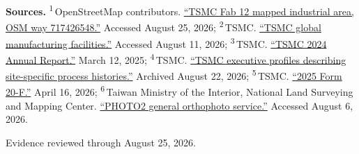 \begin{minipage}[t][0.90\textheight][t]{\textwidth}
{\sffamily\scriptsize\setlength{\emergencystretch}{1.5em}\textbf{Sources.} \textsuperscript{1}\,OpenStreetMap contributors. \href{\detokenize{https://www.openstreetmap.org/way/717426548}}{\enquote{TSMC Fab 12 mapped industrial area, OSM way 717426548.}} Accessed August 25, 2026; \textsuperscript{2}\,TSMC. \href{\detokenize{https://www.tsmc.com/english/aboutTSMC/TSMC_Fabs}}{\enquote{TSMC global manufacturing facilities.}} Accessed August 11, 2026; \textsuperscript{3}\,TSMC. \href{\detokenize{https://investor.tsmc.com/sites/ir/annual-report/2024/2024}\%\detokenize{20Annual}\%\detokenize{20Report-E.pdf}}{\enquote{TSMC 2024 Annual Report.}} March 12, 2025; \textsuperscript{4}\,TSMC. \href{\detokenize{https://web.archive.org/web/20260822170034/https://www.tsmc.com/english/aboutTSMC/executives.htm}}{\enquote{TSMC executive profiles describing site-specific process histories.}} Archived August 22, 2026; \textsuperscript{5}\,TSMC. \href{\detokenize{https://investor.tsmc.com/sites/ir/sec-filings/2025_20F}\%\detokenize{20Report.pdf}}{\enquote{2025 Form 20-F.}} April 16, 2026; \textsuperscript{6}\,Taiwan Ministry of the Interior, National Land Surveying and Mapping Center. \href{\detokenize{https://maps.nlsc.gov.tw/S09SOA/pro/Wms_ajax_list.jsp}}{\enquote{PHOTO2 general orthophoto service.}} Accessed August 6, 2026.\par}
\vfill
\noindent{\color{hairline}\rule{\linewidth}{0.4pt}}\par\smallskip
{\sffamily\scriptsize\color{black!58} Evidence reviewed through August 25, 2026.\par}
\end{minipage}
\clearpage
